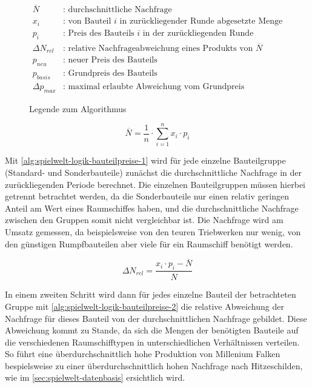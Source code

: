 \newcommand{\pd}{\Delta{}p_{max}}
\begin{figure}[ht]
     \begin{align}
          \overline{N} &\text{: durchschnittliche Nachfrage}\nonumber \\
          x_i &\text{: von Bauteil $i$ in zurückliegender Runde abgesetzte Menge}\nonumber \\
          p_i &\text{: Preis des Bauteils $i$ in der zurückliegenden Runde}\nonumber \\
          \Delta{}N_{rel} &\text{: relative Nachfrageabweichung eines Produkts von $\overline{N}$}\nonumber \\
          p_{neu} &\text{: neuer Preis des Bauteils}\nonumber \\
          p_{basis} &\text{: Grundpreis des Bauteils}\nonumber \\
          \Delta{}p_{max} &\text{: maximal erlaubte Abweichung vom Grundpreis}\nonumber
     \end{align}
     \caption{Legende zum Algorithmus}
     \label{alg:spielwelt-logik-bauteilpreise-legende}
\end{figure}

\begin{equation}
     \overline{N} = \frac{1}{n} \cdot \sum\limits_{i=1}^n {x_i \cdot p_i}
     \label{alg:spielwelt-logik-bauteilpreise-1}
\end{equation}

Mit \ref{alg:spielwelt-logik-bauteilpreise-1} wird für jede einzelne Bauteilgruppe (Standard- und
Sonderbauteile) zunächst die durchschnittliche Nachfrage in der zurückliegenden Periode berechnet.
Die einzelnen Bauteilgruppen müssen hierbei getrennt betrachtet werden, da die Sonderbauteile nur
einen relativ geringen Anteil am Wert eines Raumschiffes haben, und die durchschnittliche Nachfrage
zwischen den Gruppen somit nicht vergleichbar ist. Die Nachfrage wird am Umsatz gemessen, da
beispielsweise von den teuren Triebwerken nur wenig, von den günstigen Rumpfbauteilen aber viele für
ein Raumschiff benötigt werden.


\begin{equation}
     \Delta{}N_{rel} = \frac{x_i \cdot p_i - \overline{N}}{\overline{N}}
     \label{alg:spielwelt-logik-bauteilpreise-2}
\end{equation}

In einem zweiten Schritt wird dann für jedes einzelne Bauteil der betrachteten Gruppe mit
\ref{alg:spielwelt-logik-bauteilpreise-2} die relative Abweichung der Nachfrage für dieses Bauteil
von der durchschnittlichen Nachfrage gebildet. Diese Abweichung kommt zu Stande, da sich die Mengen
der benötigten Bauteile auf die verschiedenen Raumschifftypen in unterschiedlichen Verhältnissen
verteilen. So führt eine überdurchschnittlich hohe Produktion von Millenium Falken bespielsweise zu
einer überdurchschnittlich hohen Nachfrage nach Hitzeschilden, wie im \ref{sec:spielwelt-datenbasis}
ersichtlich wird.


